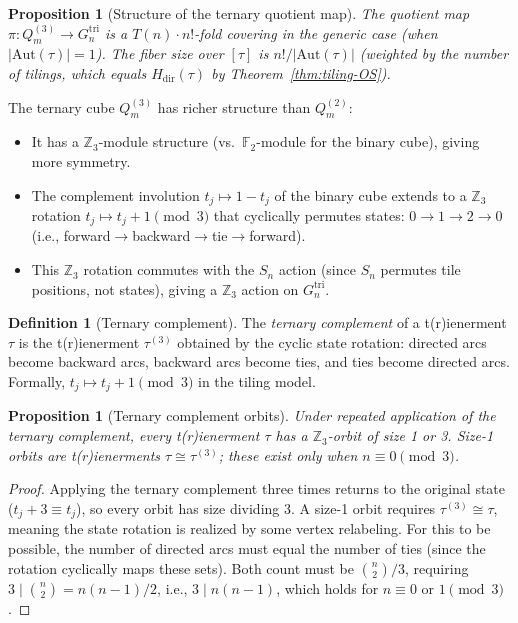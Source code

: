 \documentclass[12pt,reqno]{amsart}
\newtheorem{proposition}[theorem]{Proposition}
\theoremstyle{definition}
\newtheorem{definition}[theorem]{Definition}
\theoremstyle{plain}
\begin{document}
\begin{proposition}[Structure of the ternary quotient map]
The quotient map $\pi:Q_m^{(3)}\to G_n^{\mathrm{tri}}$ is a $T(n)\cdot n!$-fold
covering in the generic case (when $|\mathrm{Aut}(\tau)|=1$).
The fiber size over $[\tau]$ is $n!/|\mathrm{Aut}(\tau)|$ (weighted by the
number of tilings, which equals $H_{\mathrm{dir}}(\tau)$ by
Theorem~\ref{thm:tiling-OS}).
\end{proposition}

The ternary cube $Q_m^{(3)}$ has richer structure than $Q_m^{(2)}$:
\begin{itemize}
\item It has a $\mathbb{Z}_3$-module structure (vs.\ $\mathbb{F}_2$-module for
  the binary cube), giving more symmetry.
\item The complement involution $t_j\mapsto 1-t_j$ of the binary cube extends to
  a $\mathbb{Z}_3$ rotation $t_j\mapsto t_j+1\pmod{3}$ that cyclically permutes
  states: $0\to 1\to 2\to 0$ (i.e., forward$\to$backward$\to$tie$\to$forward).
\item This $\mathbb{Z}_3$ rotation commutes with the $S_n$ action (since $S_n$
  permutes tile positions, not states), giving a $\mathbb{Z}_3$ action on
  $G_n^{\mathrm{tri}}$.
\end{itemize}

\begin{definition}[Ternary complement]
The \emph{ternary complement} of a t(r)ienerment $\tau$ is the t(r)ienerment
$\tau^{(3)}$ obtained by the cyclic state rotation: directed arcs become backward
arcs, backward arcs become ties, and ties become directed arcs.  Formally,
$t_j\mapsto t_j+1\pmod 3$ in the tiling model.
\end{definition}

\begin{proposition}[Ternary complement orbits]
Under repeated application of the ternary complement, every t(r)ienerment $\tau$
has a $\mathbb{Z}_3$-orbit of size 1 or 3.  Size-1 orbits are t(r)ienerments
$\tau\cong\tau^{(3)}$; these exist only when $n\equiv 0\pmod 3$.
\end{proposition}

\begin{proof}
Applying the ternary complement three times returns to the original state
($t_j+3\equiv t_j$), so every orbit has size dividing 3.  A size-1 orbit
requires $\tau^{(3)}\cong\tau$, meaning the state rotation is realized by
some vertex relabeling.  For this to be possible, the number of directed arcs
must equal the number of ties (since the rotation cyclically maps these sets).
Both count must be $\binom{n}{2}/3$, requiring $3\mid\binom{n}{2}=n(n-1)/2$,
i.e., $3\mid n(n-1)$, which holds for $n\equiv 0$ or $1\pmod 3$.
\end{proof}
\end{document}
